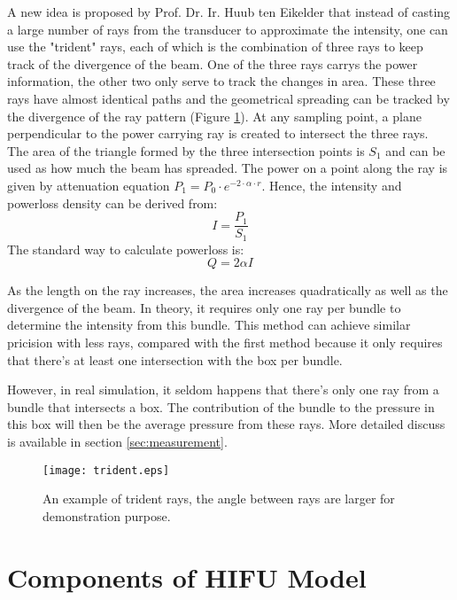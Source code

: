 A new idea is proposed by Prof. Dr. Ir. Huub ten Eikelder that instead of casting a large number of rays from the transducer to approximate the intensity, one can use the "trident" rays, each of which is the combination of three rays to keep track of the divergence of the beam. One of the three rays carrys the power information, the other two only serve to track the changes in area. These three rays have almost identical paths and the geometrical spreading can be tracked by the divergence of the ray pattern (Figure \ref{fig:Trident_ray}). At any sampling point, a plane perpendicular to the power carrying ray is created to intersect the three rays. The area of the triangle formed by the three intersection points is $S_1$ and can be used as how much the beam has spreaded. The power on a point along the ray is given by attenuation equation $P_1=P_0\cdot e^{-2\cdot \alpha \cdot r}$. Hence, the intensity and powerloss density can be derived from:
\begin{equation} \label{eq:calc_intensity}
    I=\frac{P_1}{S_1}
\end{equation}
The standard way to calculate powerloss is:
\begin{equation}
    Q=2\alpha I
\end{equation}

As the length on the ray increases, the area increases quadratically as well as the divergence of the beam. In theory, it requires only one ray per bundle to determine the intensity from this bundle. This method can achieve similar pricision with less rays, compared with the first method because it only requires that there's at least one intersection with the box per bundle.

However, in real simulation, it seldom happens that there's only one ray from a bundle that intersects a box. The contribution of the bundle to the pressure in this box will then be the average pressure from these rays. More detailed discuss is available in section \ref{sec:measurement}.

\begin{figure}[h]
    \centering
    \texttt{[image: trident.eps]}
    \caption{An example of trident rays, the angle between rays are larger for demonstration purpose.}
    \label{fig:Trident_ray}
\end{figure}

\section{Components of HIFU Model} \label{sec:components}

